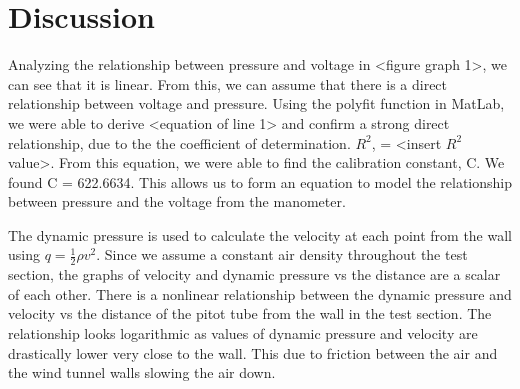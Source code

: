 \chapter{Discussion}
\label{cp:discussion}
Analyzing the relationship between pressure and voltage in <figure graph 1>, we can see that it is linear. From this, we can assume that there is a direct relationship between voltage and pressure. Using the polyfit function in MatLab, we were able to derive <equation of line 1> and confirm a strong direct relationship, due to the the coefficient of determination. $R^2$, = <insert $R^2$ value>. From this equation, we were able to find the calibration constant, C. We found C = 622.6634. This allows us to form an equation to model the relationship between pressure and the voltage from the manometer.  

The dynamic pressure is used to calculate the velocity at each point from the wall using $q =\frac{1}{2}\rho v^2$. Since we assume a constant air density throughout the test section, the graphs of velocity and dynamic pressure vs the distance are a scalar of each other. There is a nonlinear relationship between the dynamic pressure and velocity vs the distance of the pitot tube from the wall in the test section. The relationship looks logarithmic as values of dynamic pressure and velocity are drastically lower very close to the wall. This due to friction between the air and the wind tunnel walls slowing the air down.